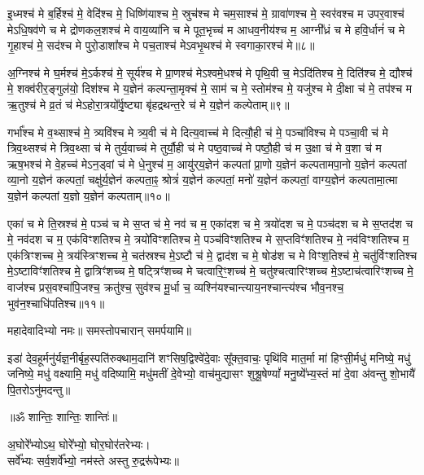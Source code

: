 इ॒ध्मश्च॑ मे ब॒र्हिश्च॑ मे॒ वेदि॑श्च मे॒ धिष्णि॑याश्च मे॒ स्रुच॑श्च मे चम॒साश्च॑ मे॒ ग्रावा॑णश्च मे॒ स्वर॑वश्च म उपर॒वाश्च॑ मेऽधि॒षव॑णे च मे द्रोणकल॒शश्च॑ मे वाय॒व्या॑नि च मे पूत॒भृच्च॑ म आधव॒नीय॑श्च म॒ आग्नी᳚ध्रं च मे हवि॒र्धानं॑ च मे गृ॒हाश्च॑ मे॒ सद॑श्च मे पुरो॒डाशा᳚श्च मे पच॒ताश्च॑ मेऽवभृ॒थश्च॑ मे स्वगाका॒रश्च॑ मे॥८॥ 

अ॒ग्निश्च॑ मे घ॒र्मश्च॑ मे॒ऽर्कश्च॑ मे॒ सूर्य॑श्च मे प्रा॒णश्च॑ मेऽश्वमे॒धश्च॑ मे पृथि॒वी च॒ मेऽदि॑तिश्च मे॒ दिति॑श्च मे॒ द्यौश्च॑ मे॒ शक्व॑रीर॒ङ्गुल॑यो॒ दिश॑श्च मे य॒ज्ञेन॑ कल्पन्ता॒मृक्च॑ मे॒ साम॑ च मे॒ स्तोम॑श्च मे॒ यजु॑श्च मे दी॒क्षा च॑ मे॒ तप॑श्च म ऋ॒तुश्च॑ मे व्र॒तं च॑ मेऽहोरा॒त्रयो᳚र्वृ॒ष्ट्या बृ॑हद्रथन्त॒रे च॑ मे य॒ज्ञेन॑ कल्पेताम्॥९॥ 

गर्भा᳚श्च मे व॒थ्साश्च॑ मे॒ त्र्यवि॑श्च मे त्र्य॒वी च॑ मे दित्य॒वाच्च॑ मे दित्यौ॒ही च॑ मे॒ पञ्चा॑विश्च मे पञ्चा॒वी च॑ मे त्रिव॒थ्सश्च॑ मे त्रिव॒थ्सा च॑ मे तुर्य॒वाच्च॑ मे तुर्यौ॒ही च॑ मे पष्ठ॒वाच्च॑ मे पष्ठौ॒ही च॑ म उ॒क्षा च॑ मे व॒शा च॑ म ऋष॒भश्च॑ मे वे॒हच्च॑ मेऽन॒ड्वां च॑ मे धे॒नुश्च॑ म॒ आयु॑र्‌य॒ज्ञेन॑ कल्पतां प्रा॒णो य॒ज्ञेन॑ कल्पतामपा॒नो य॒ज्ञेन॑ कल्पतां व्या॒नो य॒ज्ञेन॑ कल्पतां॒ चक्षु॑र्य॒ज्ञेन॑ कल्पता॒ꣴ॒ श्रोत्रं॑ य॒ज्ञेन॑ कल्पतां॒ मनो॑ य॒ज्ञेन॑ कल्पतां॒ वाग्य॒ज्ञेन॑ कल्पतामा॒त्मा य॒ज्ञेन॑ कल्पतां य॒ज्ञो य॒ज्ञेन॑ कल्पताम्॥१०॥ 

एका॑ च मे ति॒स्रश्च॑ मे॒ पञ्च॑ च मे स॒प्त च॑ मे॒ नव॑ च म॒ एका॑दश च मे॒ त्रयो॑दश च मे॒ पञ्च॑दश च मे स॒प्तद॑श च मे॒ नव॑दश च म॒ एक॑विꣳशतिश्च मे॒ त्रयो॑विꣳशतिश्च मे॒ पञ्च॑विꣳशतिश्च मे स॒प्तविꣳ॑शतिश्च मे॒ नव॑विꣳशतिश्च म॒ एक॑त्रिꣳशच्च मे॒ त्रय॑स्त्रिꣳशच्च मे॒ चत॑स्रश्च मे॒ऽष्टौ च॑ मे॒ द्वाद॑श च मे॒ षोड॑श च मे विꣳश॒तिश्च॑ मे॒ चतु॑र्विꣳशतिश्च मे॒ऽष्टाविꣳ॑शतिश्च मे॒ द्वात्रिꣳ॑शच्च मे॒ षट्त्रिꣳ॑शच्च मे चत्वारि॒ꣳ॒शच्च॑ मे॒ चतु॑श्चत्वारिꣳशच्च मे॒ऽष्टाच॑त्वारिꣳशच्च मे॒ वाज॑श्च प्रस॒वश्चा॑पि॒जश्च॒ क्रतु॑श्च॒ सुव॑श्च मू॒र्धा च॒ व्यश्नि॑यश्चान्त्याय॒नश्चान्त्य॑श्च भौव॒नश्च॒ भुव॑न॒श्चाधि॑पतिश्च॥११॥ 

महादेवादिभ्यो नमः॥ समस्तोपचारान् समर्पयामि॥

इडा॑ देव॒हूर्मनु॑र्यज्ञ॒नीर्बृह॒स्पति॑रुक्थाम॒दानि॑ शꣳसिष॒द्विश्वे॑दे॒वाः सू᳚क्त॒वाचः॒ पृथि॑वि मात॒र्मा मा॑ हिꣳसी॒र्मधु॑ मनिष्ये॒ मधु॑ जनिष्ये॒ मधु॑ वक्ष्यामि॒ मधु॑ वदिष्यामि॒ मधु॑मतीं दे॒वेभ्यो॒ वाच॑मुद्यासꣳ शुश्रू॒षेण्यां᳚ मनु॒ष्ये᳚भ्य॒स्तं मा॑ दे॒वा अ॑वन्तु शो॒भायै॑ पि॒तरोऽनु॑मदन्तु॥ 

\centerline{॥ॐ शान्तिः॒ शान्तिः॒ शान्तिः॑॥}

{\small \closesection}

अ॒घोरे᳚भ्योऽथ॒ घोरे᳚भ्यो॒ घोर॒घोर॑तरेभ्यः।\\
सर्वे᳚भ्यः सर्व॒शर्वे᳚भ्यो॒ नम॑स्ते अस्तु रु॒द्ररू॑पेभ्यः॥

